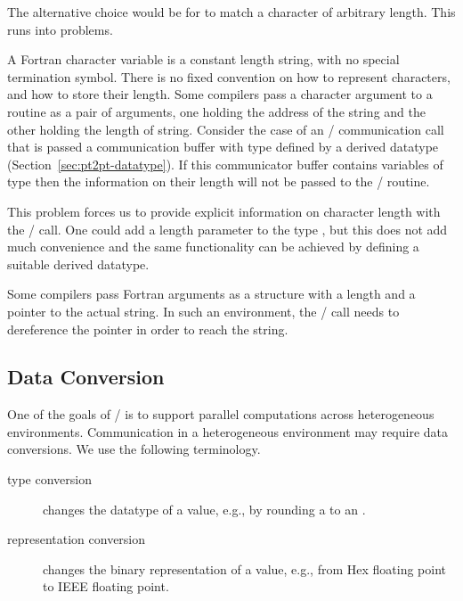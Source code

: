\begin{rationale}
The alternative choice would be for  to
match a character of arbitrary length.  This runs into problems.

A Fortran character variable is a constant length string, with no special
termination symbol.  There is no fixed convention on how to represent
characters, and how to store their length.
Some compilers pass a character argument to
a routine as a pair of arguments, one holding the address of the string and the
other holding the length of string.  Consider the case of an \MPI/
communication call that is passed a communication buffer
with type defined by a derived datatype (Section~\ref{sec:pt2pt-datatype}).
If this communicator buffer contains variables of type  then
the information on their length will not be passed to the \MPI/ routine.

This problem forces us to provide explicit information on character
length with the \MPI/ call.  One could add a length parameter to the
type , but this does not add much convenience and the same
functionality can be achieved by defining a suitable derived datatype.
\end{rationale}

\begin{implementors}
Some compilers pass Fortran  arguments as a structure with a
length and a pointer to the actual string.  In such an environment, the \MPI/
call needs to dereference the pointer in order to reach the string.
\end{implementors}


\subsection{Data Conversion}
\label{subsec:pt2pt-conversion}

One of the goals of \MPI/ is to support parallel computations across
heterogeneous environments.  Communication in a heterogeneous
environment may require data conversions.
We use the following terminology.
\begin{description}
\item[type conversion] changes the datatype of a value, e.g., by rounding a
 to an .
\item[representation conversion] changes the binary representation of a value,
e.g., from Hex floating point to IEEE floating point.
\end{description}

